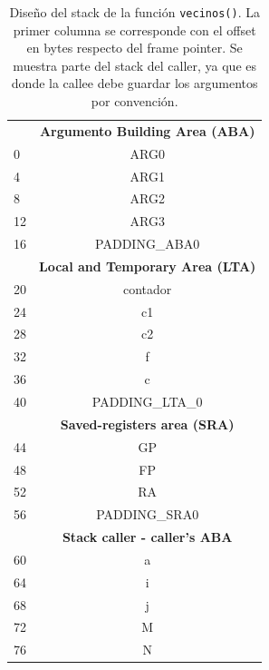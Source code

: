 \documentclass[a4paper,12pt]{article}
\numberwithin{equation}{section}
\numberwithin{figure}{section}
\begin{document}
	\begin{table}[H]
		\centering
		\begin{tabular}{@{}l|c|@{}}
			\cmidrule(l){2-2}
			\multicolumn{1}{c|}{\textbf{}} & \textbf{Argumento Building Area (ABA)} \\ \cmidrule(l){2-2} 
			0 & ARG0 \\ \cmidrule(l){2-2} 
			4 & ARG1 \\ \cmidrule(l){2-2} 
			8 & ARG2 \\ \cmidrule(l){2-2} 
			12 & ARG3 \\ \cmidrule(l){2-2} 
			16 & PADDING\_ABA0 \\ \cmidrule(l){2-2} 
			\multicolumn{1}{c|}{\textbf{}} & \textbf{Local and Temporary Area (LTA)} \\ \cmidrule(l){2-2} 
			20 & contador \\ \cmidrule(l){2-2} 
			24 & c1 \\ \cmidrule(l){2-2} 
			28 & c2 \\ \cmidrule(l){2-2} 
			32 & f \\ \cmidrule(l){2-2} 
			36 & c \\ \cmidrule(l){2-2} 
			40 & PADDING\_LTA\_0 \\ \cmidrule(l){2-2} 
			\multicolumn{1}{c|}{\textbf{}} & \textbf{Saved-registers area (SRA)} \\ \cmidrule(l){2-2} 
			44 & GP \\ \cmidrule(l){2-2} 
			48 & FP \\ \cmidrule(l){2-2} 
			52 & RA \\ \cmidrule(l){2-2} 
			56 & PADDING\_SRA0 \\ \cmidrule(l){2-2} 
			\multicolumn{1}{c|}{\textbf{}} & \textbf{Stack caller - caller's ABA} \\ \cmidrule(l){2-2} 
			60 & a \\ \cmidrule(l){2-2} 
			64 & i \\ \cmidrule(l){2-2} 
			68 & j \\ \cmidrule(l){2-2} 
			72 & M \\ \cmidrule(l){2-2} 
			76 & N \\ \cmidrule(l){2-2} 
		\end{tabular}
		\caption{Diseño del stack de la función \texttt{vecinos()}. La primer columna se corresponde con el offset en bytes respecto del frame pointer. Se muestra parte del stack del caller, ya que es donde la callee debe guardar los argumentos por convención.}
		\label{stack_vecinos}
	\end{table}
	
\end{document}
